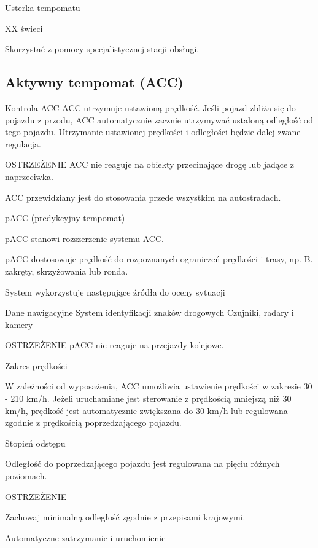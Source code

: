 Usterka tempomatu

XX świeci
\begin{itemizeArrow}
	\itemArrow Skorzystać z pomocy specjalistycznej stacji obsługi.
\end{itemizeArrow}

\subsection{Aktywny tempomat (ACC)}

Kontrola ACC
ACC utrzymuje ustawioną prędkość. Jeśli pojazd zbliża się do pojazdu z przodu, ACC automatycznie zacznie utrzymywać ustaloną odległość od tego pojazdu.
Utrzymanie ustawionej prędkości i odległości będzie dalej zwane regulacja.

OSTRZEŻENIE
ACC nie reaguje na obiekty przecinające drogę lub jadące z naprzeciwka.

ACC przewidziany jest do stosowania przede wszystkim na autostradach.

pACC (predykcyjny tempomat)

pACC stanowi rozszerzenie systemu ACC.

pACC dostosowuje prędkość do rozpoznanych ograniczeń prędkości i trasy, np. B. zakręty, skrzyżowania lub ronda.

System wykorzystuje następujące źródła do oceny sytuacji
\begin{itemizeTriangle}
	\itemTriangle Dane nawigacyjne
	\itemTriangle System identyfikacji znaków drogowych
	\itemTriangle Czujniki, radary i kamery
\end{itemizeTriangle}

OSTRZEŻENIE
pACC nie reaguje na przejazdy kolejowe.

Zakres prędkości

W zależności od wyposażenia, ACC umożliwia ustawienie prędkości w zakresie 30 - 210 km/h.
Jeżeli uruchamiane jest sterowanie z prędkością mniejszą niż 30 km/h, prędkość jest automatycznie zwiększana do 30 km/h lub regulowana zgodnie z prędkością poprzedzającego pojazdu.

Stopień odstępu

Odległość do poprzedzającego pojazdu jest regulowana na pięciu różnych poziomach.

OSTRZEŻENIE
\begin{itemizeTriangle}
	\itemTriangle Zachowaj minimalną odległość zgodnie z przepisami krajowymi.
\end{itemizeTriangle}

Automatyczne zatrzymanie i uruchomienie

